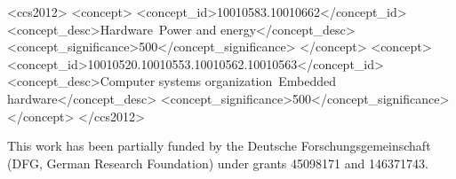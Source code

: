 \documentclass[acmsmall]{acmart}
\begin{document}
\begin{CCSXML}
<ccs2012>
   <concept>
       <concept_id>10010583.10010662</concept_id>
       <concept_desc>Hardware~Power and energy</concept_desc>
       <concept_significance>500</concept_significance>
       </concept>
   <concept>
       <concept_id>10010520.10010553.10010562.10010563</concept_id>
       <concept_desc>Computer systems organization~Embedded hardware</concept_desc>
       <concept_significance>500</concept_significance>
       </concept>
 </ccs2012>
\end{CCSXML}
%










 
\maketitle










\begin{acks}
This work has been partially funded by the Deutsche Forschungsgemeinschaft (DFG, German Research Foundation)
under grants 45098171 and 146371743.
\end{acks}
%
%


\end{document}
